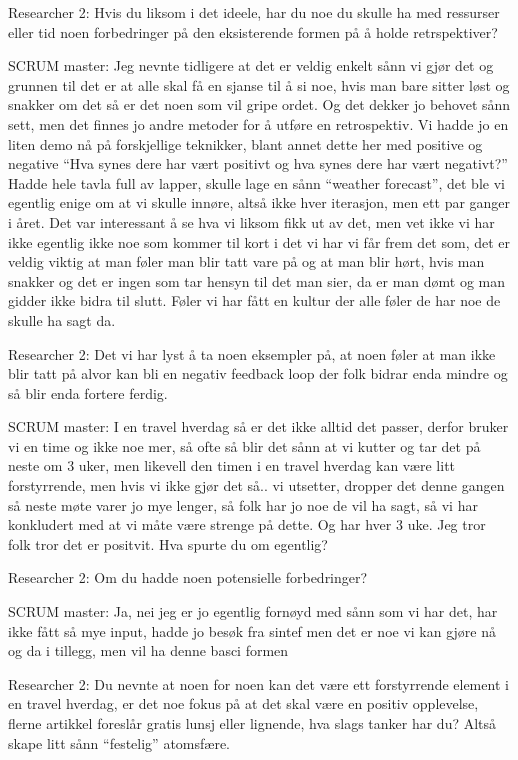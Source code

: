 \documentclass[12pt, a4paper]{report}
\begin{document}
Researcher 2: Hvis du liksom i det ideele, har du noe du skulle ha med ressurser eller tid noen forbedringer på den eksisterende formen på å holde retrspektiver?

SCRUM master: Jeg nevnte tidligere at det er veldig enkelt sånn vi gjør det  og grunnen til det er at alle skal få en sjanse til å si noe, hvis man bare sitter løst og snakker om det så er det noen som vil gripe ordet. Og det dekker jo behovet sånn sett, men det finnes jo andre metoder for å utføre en retrospektiv. Vi hadde jo en liten demo nå på forskjellige teknikker, blant annet dette her med positive og negative ``Hva synes dere har vært positivt og hva synes dere har vært negativt?'' Hadde hele tavla full av lapper, skulle lage en sånn ``weather forecast'', det ble vi egentlig enige om at vi skulle innøre, altså ikke hver iterasjon, men ett par ganger i året. Det var interessant å se hva vi liksom fikk ut av det, men vet ikke vi har ikke egentlig ikke noe som kommer til kort i det vi har vi får frem det som, det er veldig viktig at man føler man blir tatt vare på og at man blir hørt, hvis man snakker og det er ingen som tar hensyn til det man sier, da er man dømt og man gidder ikke bidra til slutt. Føler vi har fått en kultur der alle føler de har noe de skulle ha sagt da.

Researcher 2: Det vi har lyst å ta noen eksempler på, at noen føler at man ikke blir tatt på alvor kan bli en negativ feedback loop der folk bidrar enda mindre og så blir enda fortere ferdig.

SCRUM master: I en travel hverdag så er det ikke alltid det passer, derfor bruker vi en time og ikke noe mer, så ofte så blir det sånn at vi kutter og tar det på neste om 3 uker, men likevell den timen i en travel hverdag kan være litt forstyrrende, men hvis vi ikke gjør det så.. vi utsetter, dropper det denne gangen så neste møte varer jo mye lenger, så folk har jo noe de vil ha sagt, så vi har konkludert med at vi måte være strenge på dette. Og har hver 3 uke. Jeg tror folk tror det er positvit. Hva spurte du om egentlig?

Researcher 2: Om du hadde noen potensielle forbedringer?

SCRUM master: Ja, nei jeg er jo egentlig fornøyd med sånn som vi har det, har ikke fått så mye input, hadde jo besøk fra sintef men det er noe vi kan gjøre nå og da i tillegg, men vil ha denne basci formen

Researcher 2: Du nevnte at noen for noen kan det være ett forstyrrende element i en travel hverdag, er det noe fokus på at det skal være en positiv opplevelse, flerne artikkel foreslår gratis lunsj eller lignende, hva slags tanker har du? Altså skape litt sånn ``festelig'' atomsfære.
\end{document}
